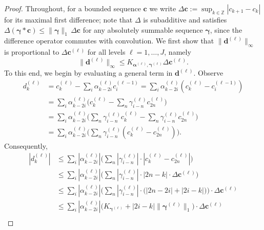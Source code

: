 \documentclass[11pt,a4paper]{article}
\theoremstyle{definition}
\begin{document}
\begin{proof}
    Throughout, for a bounded sequence $\boldsymbol{c}$ we write $\Delta\boldsymbol{c}\mathrel{:=}\sup_{k\in\mathbb{Z}}|c_{k+1}-c_k|$ for its maximal first difference; note that $\Delta$ is subadditive and satisfies $\Delta(\boldsymbol{\gamma}*\boldsymbol{c})\leq\|\boldsymbol{\gamma}\|_1\,\Delta\boldsymbol{c}$ for any absolutely summable sequence $\boldsymbol{\gamma}$, since the difference operator commutes with convolution. We first show that $\|\boldsymbol{d}^{(\ell)}\|_\infty$ is proportional to $\Delta\boldsymbol{c}^{(\ell)}$ for all levels $\ell=1,\dots,J$, namely
    \begin{equation}\label{eqn:details_Delta}
        \|\boldsymbol{d}^{(\ell)}\|_\infty \leq K_{\boldsymbol{\alpha}^{(\ell)},\boldsymbol{\gamma}^{(\ell)}} \Delta \boldsymbol{c}^{(\ell)}.
    \end{equation}
    To this end, we begin by evaluating a general term in $\boldsymbol{d}^{(\ell)}$. Observe
    \begin{equation*}
    \begin{split}
        d^{(\ell)}_k & =c^{(\ell)}_k-\sum_i \alpha^{(\ell)}_{k-2i}c^{(\ell-1)}_i=\sum_i \alpha^{(\ell)}_{k-2i}(c^{(\ell)}_k-c^{(\ell-1)}_i)\\
        & =\sum_i \alpha^{(\ell)}_{k-2i}\bigg(c^{(\ell)}_k-\sum_n \gamma^{(\ell)}_{i-n} c^{(\ell)}_{2n}\bigg)\\
        & =\sum_i \alpha^{(\ell)}_{k-2i}\bigg(\sum_n \gamma^{(\ell)}_{i-n}c^{(\ell)}_k-\sum_n \gamma^{(\ell)}_{i-n} c^{(\ell)}_{2n}\bigg)\\
        & =\sum_i \alpha^{(\ell)}_{k-2i}\bigg(\sum_n \gamma^{(\ell)}_{i-n}(c^{(\ell)}_k-c^{(\ell)}_{2n})\bigg).
    \end{split}
    \end{equation*}
    Consequently,
    \begin{equation*}
    \begin{split}
        |d^{(\ell)}_k| & \leq \sum_i|\alpha^{(\ell)}_{k-2i}|\bigg(\sum_n |\gamma^{(\ell)}_{i-n}|\cdot |c^{(\ell)}_k-c^{(\ell)}_{2n}|\bigg)\\ & \leq \sum_i|\alpha^{(\ell)}_{k-2i}|\bigg(\sum_n |\gamma^{(\ell)}_{i-n}|\cdot |2n-k| \cdot \Delta\boldsymbol{c}^{(\ell)}\bigg)\\
        & \leq \sum_i|\alpha^{(\ell)}_{k-2i}|\bigg(\sum_n |\gamma^{(\ell)}_{i-n}|\cdot \big(|2n-2i|+|2i-k|\big) \bigg) \cdot \Delta\boldsymbol{c}^{(\ell)}\\
        & \leq \sum_i|\alpha^{(\ell)}_{k-2i}|\bigg(K_{\boldsymbol{\gamma}^{(\ell)}}+|2i-k| \|\boldsymbol{\gamma}^{(\ell)}\|_1\bigg) \cdot \Delta\boldsymbol{c}^{(\ell)}\\

\end{split}
\end{equation*}
\end{proof}
\end{document}
